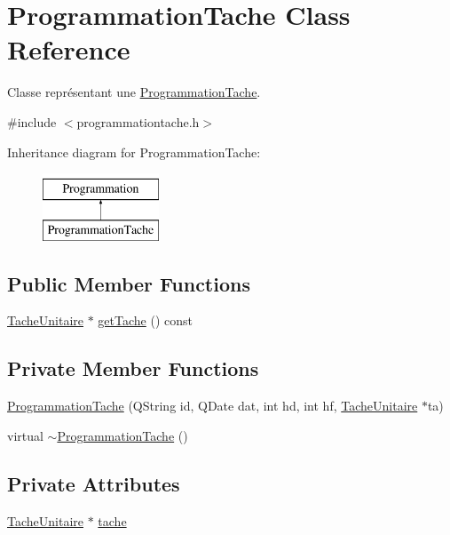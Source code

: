 \hypertarget{class_programmation_tache}{}\section{Programmation\+Tache Class Reference}
\label{class_programmation_tache}


Classe représentant une \hyperlink{class_programmation_tache}{Programmation\+Tache}.  




{\ttfamily \#include $<$programmationtache.\+h$>$}

Inheritance diagram for Programmation\+Tache\+:\begin{figure}[H]
\begin{center}
\leavevmode
\includegraphics[height=2.000000cm]{class_programmation_tache}
\end{center}
\end{figure}
\subsection*{Public Member Functions}
\begin{DoxyCompactItemize}
\item 
\hyperlink{class_tache_unitaire}{Tache\+Unitaire} $\ast$ \hyperlink{class_programmation_tache_a768420cbc2955fbd0fa4d51651e883f0}{get\+Tache} () const 
\end{DoxyCompactItemize}
\subsection*{Private Member Functions}
\begin{DoxyCompactItemize}
\item 
\hyperlink{class_programmation_tache_a3e3ed2c9849c76f431ad9ae80e1832a9}{Programmation\+Tache} (Q\+String id, Q\+Date dat, int hd, int hf, \hyperlink{class_tache_unitaire}{Tache\+Unitaire} $\ast$ta)
\item 
virtual \hyperlink{class_programmation_tache_a3dae2689c0f94e4f33dd19a7362e498c}{$\sim$\+Programmation\+Tache} ()
\end{DoxyCompactItemize}
\subsection*{Private Attributes}
\begin{DoxyCompactItemize}
\item 
\hyperlink{class_tache_unitaire}{Tache\+Unitaire} $\ast$ \hyperlink{class_programmation_tache_a107df0f6b1dca79ca0b83739d8d177dc}{tache}
\end{DoxyCompactItemize}
